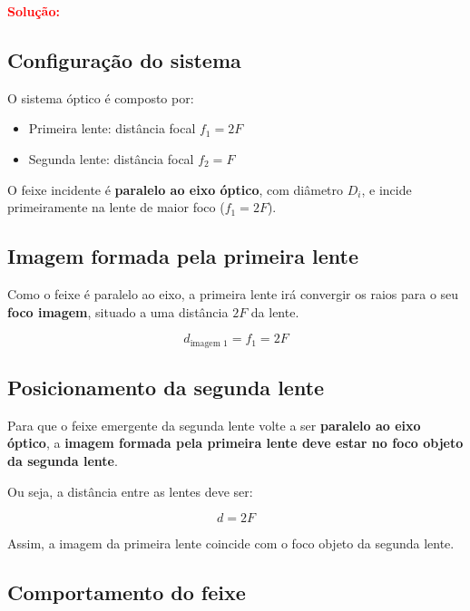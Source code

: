 \documentclass[a4paper,12pt]{article}
\begin{document}
\begin{flushleft}
\begin{center}
\begin{tikzpicture}[scale=1.2]
\end{tikzpicture}
\end{center}

\textcolor{red}{\textbf{Solução:}}\\

\subsection*{Configuração do sistema}

O sistema óptico é composto por:

\begin{itemize}
    \item Primeira lente: distância focal \( f_1 = 2F \)
    \item Segunda lente: distância focal \( f_2 = F \)
\end{itemize}

O feixe incidente é \textbf{paralelo ao eixo óptico}, com diâmetro \( D_i \), e incide primeiramente na lente de maior foco (\( f_1 = 2F \)).

\subsection*{Imagem formada pela primeira lente}

Como o feixe é paralelo ao eixo, a primeira lente irá convergir os raios para o seu \textbf{foco imagem}, situado a uma distância \( 2F \) da lente.

\begin{equation}
d_{\text{imagem 1}} = f_1 = 2F
\end{equation}

\subsection*{Posicionamento da segunda lente}

Para que o feixe emergente da segunda lente volte a ser \textbf{paralelo ao eixo óptico}, a \textbf{imagem formada pela primeira lente deve estar no foco objeto da segunda lente}.

Ou seja, a distância entre as lentes deve ser:

\begin{equation}
d = 2F
\end{equation}

Assim, a imagem da primeira lente coincide com o foco objeto da segunda lente.

\subsection*{Comportamento do feixe}


\end{flushleft}
\end{document}
